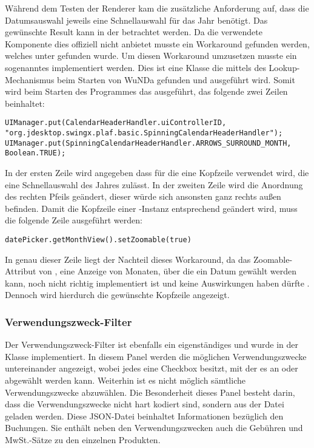 Während dem Testen der Renderer kam die zusätzliche Anforderung auf, dass die Datumsauswahl jeweils eine Schnellauswahl für das Jahr benötigt.
Das gewünschte Result kann in der  betrachtet werden.
Da die verwendete Komponente  dies offiziell nicht anbietet musste ein Workaround gefunden werden, welches unter \autocite{so-jxdatepicker} gefunden wurde.
Um diesen Workaround umzusetzen musste ein sogenanntes  implementiert werden. 
Dies ist eine Klasse die mittels des Lookup-Mechanismus beim Starten von \ac{WuNDa} gefunden und ausgeführt wird.
Somit wird beim Starten des Programmes das   ausgeführt, das folgende zwei Zeilen beinhaltet:
\begin{lstlisting}
UIManager.put(CalendarHeaderHandler.uiControllerID, "org.jdesktop.swingx.plaf.basic.SpinningCalendarHeaderHandler");
UIManager.put(SpinningCalendarHeaderHandler.ARROWS_SURROUND_MONTH, Boolean.TRUE);
\end{lstlisting}
In der ersten Zeile wird angegeben dass für die  eine Kopfzeile verwendet wird, die eine Schnellauswahl des Jahres zulässt.
In der zweiten Zeile wird die Anordnung des rechten Pfeils geändert, dieser würde sich ansonsten ganz rechts außen befinden.
Damit die Kopfzeile einer -Instanz  entsprechend geändert wird, muss die folgende Zeile ausgeführt werden:
\begin{lstlisting}
datePicker.getMonthView().setZoomable(true)
\end{lstlisting}
In genau dieser Zeile liegt der Nachteil dieses Workaround, da das Zoomable-Attribut von , eine Anzeige von Monaten, über die ein Datum gewählt werden kann, noch nicht richtig implementiert ist und keine Auswirkungen haben dürfte \autocite[vgl.][]{swingx-jxdatepicker}.
Dennoch wird hierdurch die gewünschte Kopfzeile angezeigt.

\subsubsection{Verwendungszweck-Filter}
Der Verwendungszweck-Filter ist ebenfalls ein eigenständiges  und wurde in der Klasse  implementiert.
In diesem Panel werden die möglichen Verwendungszwecke untereinander angezeigt, wobei jedes eine Checkbox besitzt, mit der es an oder abgewählt werden kann. Weiterhin ist es nicht möglich sämtliche Verwendungszwecke abzuwählen.
Die Besonderheit dieses Panel besteht darin, dass die Verwendungszwecke nicht hart kodiert sind, sondern aus der  Datei geladen werden.
Diese JSON-Datei beinhaltet Informationen bezüglich den Buchungen. Sie enthält neben den Verwendungszwecken auch die Gebühren und MwSt.-Sätze zu den einzelnen Produkten. 


